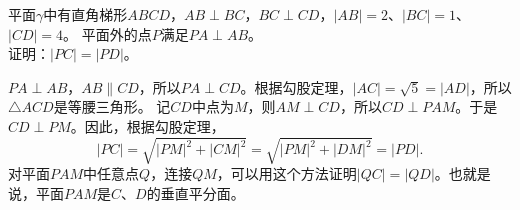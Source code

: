 \documentclass[12pt,UTF8,fontset=none]{ctexbook}
\begin{document}
\begin{et}\label{et:1-3-20}
    平面$\gamma$中有直角梯形$ABCD$，$AB \perp BC$，$BC \perp CD$，$|AB|= 2$、$|BC| = 1$、$|CD| = 4$。
    平面外的点$P$满足$PA \perp AB$。\\
    证明：$|PC| = |PD|$。
\end{et}
\begin{so}
    $PA \perp AB$，$AB \parallel CD$，所以$PA \perp CD$。根据勾股定理，$|AC| = \sqrt{5} = |AD|$，所以$\triangle ACD$是等腰三角形。
    记$CD$中点为$M$，则$AM \perp CD$，所以$CD \perp PAM$。于是$CD \perp PM$。因此，根据勾股定理，
    $$ |PC| = \sqrt{|PM|^2 + |CM|^2} = \sqrt{|PM|^2 + |DM|^2} = |PD|.$$
    对平面$PAM$中任意点$Q$，连接$QM$，可以用这个方法证明$|QC| = |QD|$。也就是说，平面$PAM$是$C$、$D$的垂直平分面。\\

\end{so}
\end{document}
